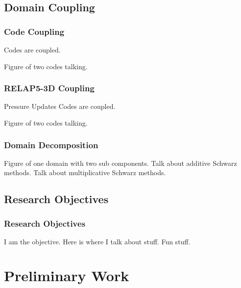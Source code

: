 \documentclass[compress,xcolor=table]{beamer}
\begin{document}
\subsection[Domain Coupling]{Domain Coupling}
\begin{frame}
\frametitle{Code Coupling}

Codes are coupled.

Figure of two codes talking.

\end{frame}
\begin{frame}
\frametitle{RELAP5-3D Coupling}

Pressure Updates
Codes are coupled.

Figure of two codes talking.

\end{frame}
\begin{frame}
\frametitle{Domain Decomposition}

Figure of one domain with two sub components.
Talk about additive Schwarz methods.
Talk about multiplicative Schwarz methods.

\end{frame}
\subsection[Research Objectives]{Research Objectives}
\begin{frame}
\frametitle{Research Objectives}

I am the objective.
Here is where I talk about stuff.
Fun stuff.

\end{frame}
\section[Preliminary Work]{Preliminary Work}
\end{document}
